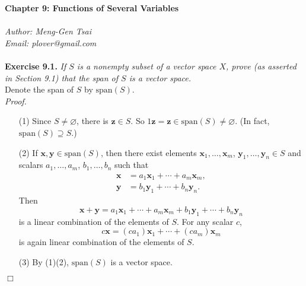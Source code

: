 \documentclass{article}
\begin{document}
\textbf{\Large Chapter 9: Functions of Several Variables} \\\\



\emph{Author: Meng-Gen Tsai} \\
\emph{Email: plover@gmail.com} \\\\






\textbf{Exercise 9.1.}
\emph{If $S$ is a nonempty subset of a vector space $X$,
prove (as asserted in Section 9.1) that the span of $S$ is a vector space.} \\

Denote the span of $S$ by $\mathrm{span}(S)$. \\

\emph{Proof.}
\begin{enumerate}
\item[(1)]
  Since $S \neq \varnothing$, there is $\mathbf{z} \in S$.
  So $1\mathbf{z} = \mathbf{z} \in \mathrm{span}(S) \neq \varnothing$.
  (In fact, $\mathrm{span}(S) \supseteq S$.)

\item[(2)]
  If $\mathbf{x}, \mathbf{y} \in \mathrm{span}(S)$,
  then there exist elements
  $\mathbf{x}_1, \ldots, \mathbf{x}_m$, $\mathbf{y}_1, \ldots, \mathbf{y}_n \in S$
  and scalars $a_1, \ldots, a_m$, $b_1, \ldots, b_n$ such that
  \begin{align*}
    \mathbf{x} &= a_1 \mathbf{x}_1 + \cdots + a_m \mathbf{x}_m, \\
    \mathbf{y} &= b_1 \mathbf{y}_1 + \cdots + b_n \mathbf{y}_n.
  \end{align*}
  Then
  \[
    \mathbf{x}+\mathbf{y}
    = a_1 \mathbf{x}_1 + \cdots + a_m \mathbf{x}_m
      + b_1 \mathbf{y}_1 + \cdots + b_n \mathbf{y}_n
  \]
  is a linear combination of the elements of $S$.
  For any scalar $c$,
  \[
    c\mathbf{x} = (ca_1) \mathbf{x}_1 + \cdots + (ca_m) \mathbf{x}_m
  \]
  is again linear combination of the elements of $S$.

\item[(3)]
  By (1)(2), $\mathrm{span}(S)$ is a vector space.
\end{enumerate}
$\Box$ \\
\end{document}
